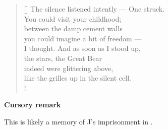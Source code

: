 \documentclass[a4paper,12pt,twoside,final]{book}
\begin{document}
\newpage


\settowidth{\versewidth}{The silence listened intently --- One struck.}

\begin{verse}[\versewidth]
  The silence listened intently --- One struck. \\
  You could visit your childhood; \\
  between the damp cement walls \\
  you could imagine a bit of freedom --- \\
  I thought. And as soon as I stood up, \\
  the stars, the Great Bear \\
  indeed were glittering above, \\
  like the grilles up in the silent cell. \\!
\end{verse}


\bigskip

\noindent \textbf{Cursory remark}

\medskip

This is likely a memory of J's imprisonment in .

\newpage

\settowidth{\versewidth}{gondoltam. S hát hát amint fölállok}
\end{document}

